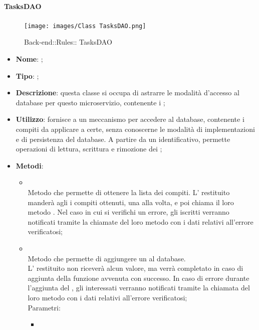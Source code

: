 \hypertarget{ TasksDAO_label}{\paragraph{ TasksDAO}}
\begin{figure}[h]
	\centering
	\texttt{[image: images/Class TasksDAO.png]}
	\caption{Back-end::Rules:: TasksDAO}
\end{figure}
\begin{itemize}
	\item \textbf{Nome}: ;
	\item \textbf{Tipo}: ;
	\item \textbf{Descrizione}: questa classe si occupa di astrarre le modalità d'accesso al database per questo microservizio, contenente i ;
	\item \textbf{Utilizzo}: fornisce a  un meccanismo per accedere al database, contenente i compiti da applicare a certe, senza conoscerne le modalità di implementazioni e di persistenza del database. A partire da un identificativo, permette operazioni di lettura, scrittura e rimozione dei ;
	\item \textbf{Metodi}:
	\begin{itemize}
		\item[]  \\
		Metodo che permette di ottenere la lista dei compiti. L' restituito manderà agli  i compiti ottenuti, una alla volta, e poi chiama il loro metodo . Nel caso in cui si verifichi un errore, gli  iscritti verranno notificati tramite la chiamate del loro metodo  con i dati relativi all'errore verificatosi;\\
		\item[]  \\
		Metodo che permette di aggiungere un  al database. \\ L' restituito non riceverà alcun valore, ma verrà completato in caso di aggiunta della funzione avvenuta con successo. In caso di errore durante l'aggiunta del , gli  interessati verranno notificati tramite la chiamata del loro metodo  con i dati relativi all'errore verificatosi;\\
		Parametri:
		\begin{itemize}
			\item {} \\

\end{itemize}
\end{itemize}
\end{itemize}

